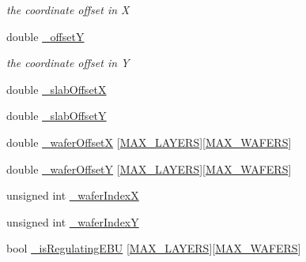 \begin{DoxyCompactItemize}
\begin{DoxyCompactList}\small\item\em the coordinate offset in X \end{DoxyCompactList}\item 
double \hyperlink{class_d_d4hep_1_1_d_d_segmentation_1_1_megatile_layer_grid_x_y_ae20ad9ed770bb9bce72ee3838a6abb59}{\+\_\+offsetY}
\begin{DoxyCompactList}\small\item\em the coordinate offset in Y \end{DoxyCompactList}\item 
double \hyperlink{class_d_d4hep_1_1_d_d_segmentation_1_1_megatile_layer_grid_x_y_a2a958dcddea84e48565a2a42f4ebcf10}{\+\_\+slab\+OffsetX}
\item 
double \hyperlink{class_d_d4hep_1_1_d_d_segmentation_1_1_megatile_layer_grid_x_y_a61ef3df26e0b23cef4750bcdb597c88f}{\+\_\+slab\+OffsetY}
\item 
double \hyperlink{class_d_d4hep_1_1_d_d_segmentation_1_1_megatile_layer_grid_x_y_a631f3f1389a8cf6f1f83489aa788d558}{\+\_\+wafer\+OffsetX} \mbox{[}\hyperlink{_megatile_layer_grid_x_y_8h_ade9d4b2ac5f29fe89ffea40e7c58c9d6}{M\+A\+X\+\_\+\+L\+A\+Y\+E\+RS}\mbox{]}\mbox{[}\hyperlink{_d_d_segmentation_2include_2_d_d_segmentation_2_wafer_grid_x_y_8h_ace2f1e396fdb2a1510290218c8cb476a}{M\+A\+X\+\_\+\+W\+A\+F\+E\+RS}\mbox{]}
\item 
double \hyperlink{class_d_d4hep_1_1_d_d_segmentation_1_1_megatile_layer_grid_x_y_aecce12c3e118e5e9176a46395938e8f8}{\+\_\+wafer\+OffsetY} \mbox{[}\hyperlink{_megatile_layer_grid_x_y_8h_ade9d4b2ac5f29fe89ffea40e7c58c9d6}{M\+A\+X\+\_\+\+L\+A\+Y\+E\+RS}\mbox{]}\mbox{[}\hyperlink{_d_d_segmentation_2include_2_d_d_segmentation_2_wafer_grid_x_y_8h_ace2f1e396fdb2a1510290218c8cb476a}{M\+A\+X\+\_\+\+W\+A\+F\+E\+RS}\mbox{]}
\item 
unsigned int \hyperlink{class_d_d4hep_1_1_d_d_segmentation_1_1_megatile_layer_grid_x_y_ae5d63f80a247fc98ec77fea73d93be60}{\+\_\+wafer\+IndexX}
\item 
unsigned int \hyperlink{class_d_d4hep_1_1_d_d_segmentation_1_1_megatile_layer_grid_x_y_a42e3bd719291c17dafe836762a6d7f02}{\+\_\+wafer\+IndexY}
\item 
bool \hyperlink{class_d_d4hep_1_1_d_d_segmentation_1_1_megatile_layer_grid_x_y_a46909b6552b97789492f2b8c97ed8cb6}{\+\_\+is\+Regulating\+E\+BU} \mbox{[}\hyperlink{_megatile_layer_grid_x_y_8h_ade9d4b2ac5f29fe89ffea40e7c58c9d6}{M\+A\+X\+\_\+\+L\+A\+Y\+E\+RS}\mbox{]}\mbox{[}\hyperlink{_d_d_segmentation_2include_2_d_d_segmentation_2_wafer_grid_x_y_8h_ace2f1e396fdb2a1510290218c8cb476a}{M\+A\+X\+\_\+\+W\+A\+F\+E\+RS}\mbox{]}

\end{DoxyCompactItemize}

